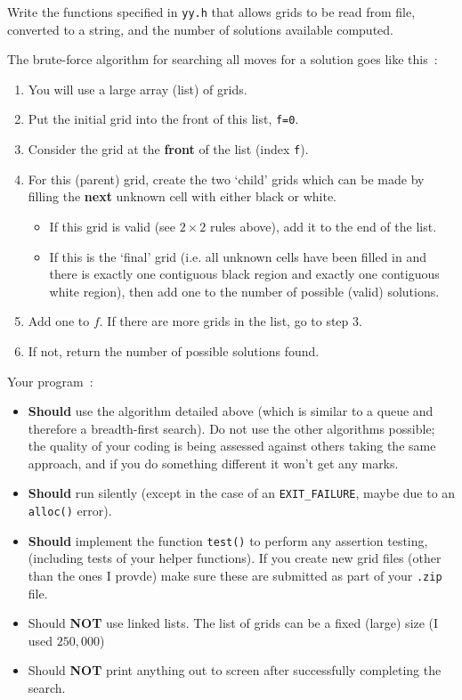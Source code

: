 \begin{exercise}
Write the functions specified in \verb^yy.h^ that allows grids to
be read from file, converted to a string, and the number
of solutions available computed.

\noindent
The brute-force algorithm for searching all moves for a
solution goes like this~:
\begin{enumerate}
\item You will use a large array (list) of grids.
\item Put the initial grid into the front of this list, \verb^f=0^.
\item Consider the grid at the {\bf front} of the list (index \verb$f$).
\item For this (parent) grid, create the two `child' grids which can be made 
by filling the {\bf next} unknown cell with either black or white.
\begin{itemize}
\item If this grid is valid (see $2\times 2$ rules above), add it to the end of the list.
\item If this is the `final' grid (i.e. all unknown cells have been filled in and there is
exactly one contiguous black region and exactly one contiguous white region), then add
one to the number of possible (valid) solutions.
\end{itemize}
\item Add one to $f$. If there are more grids in the list, go to step $3$.
\item If not, return the number of possible solutions found.
\end{enumerate}

\noindent
Your program~:
\begin{itemize}
\item {\bf Should} use the algorithm detailed above (which is similar to a queue and therefore a breadth-first search). Do not use the other algorithms possible; the quality of your coding is being assessed against others taking the same approach, and if you do something different it won't get any marks.
\item {\bf Should} run silently (except in the case of an \verb^EXIT_FAILURE^, maybe due to an \verb^alloc()^ error).
\item {\bf Should} implement the function \verb^test()^ to perform any assertion testing, (including tests of your helper functions). If you create new grid files (other than the ones I provde) make sure these are submitted as part of your \verb^.zip^ file.
\item Should {\bf NOT} use linked lists.
The list of grids can be a fixed (large) size (I used $250,000$)
\item Should {\bf NOT} print anything out to screen after successfully
completing the search.
\end{itemize}



\end{exercise}
